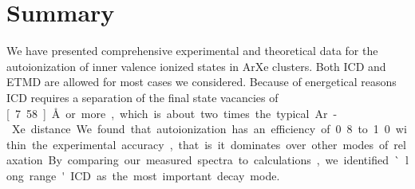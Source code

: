 \section{Summary}
%
We have presented comprehensive experimental and theoretical data for the
autoionization of inner valence ionized states in ArXe clusters.
Both ICD and ETMD are allowed for most cases we considered.
Because of energetical reasons ICD requires a separation of the final state
vacancies of \unit[7.58]{\AA} or more, which is about two times the typical
Ar-Xe distance.
We found that autoionization has an efficiency of 0.8 to 1.0 within the
experimental accuracy, that is it dominates over other modes of relaxation.
By comparing our measured spectra to calculations, we identified `long range'
ICD as the most important decay mode.
